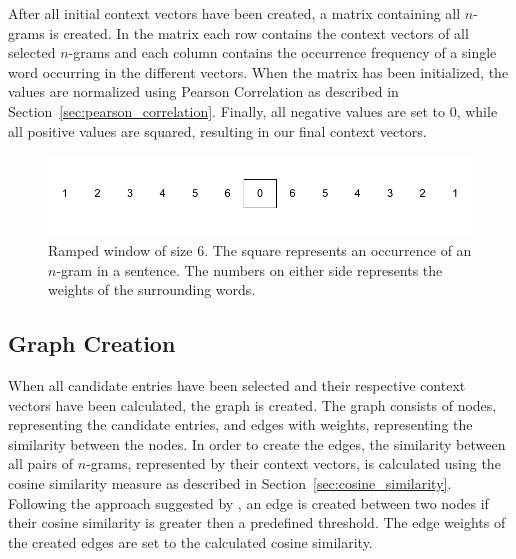 After all initial context vectors have been created, a matrix containing all $n$-grams is created. In the matrix each row contains the context vectors of all selected $n$-grams and each column contains the occurrence frequency of a single word occurring in the different vectors. When the matrix has been initialized, the values are normalized using Pearson Correlation as described in Section~\ref{sec:pearson_correlation}. Finally, all negative values are set to 0, while all positive values are squared, resulting in our final context vectors. \\

\begin{figure}[t]
    \centering
    \includegraphics[width=\textwidth]{./figs/ramped_window}
    \caption[Ramped window of size 6]{Ramped window of size 6. The square represents an occurrence of an $n$-gram in a sentence. The numbers on either side represents the weights of the surrounding words.}
    \label{fig:ramped_window}
\end{figure}


\subsection*{Graph Creation}
When all candidate entries have been selected and their respective context vectors have been calculated, the graph is created. The graph consists of nodes, representing the candidate entries, and edges with weights, representing the similarity between the nodes. In order to create the edges, the similarity between all pairs of $n$-grams, represented by their context vectors, is calculated using the cosine similarity measure as described in Section~\ref{sec:cosine_similarity}. Following the approach suggested by \cite{Velikovich2010}, an edge is created between two nodes if their cosine similarity is greater then a predefined threshold. The edge weights of the created edges are set to the calculated cosine similarity. 

